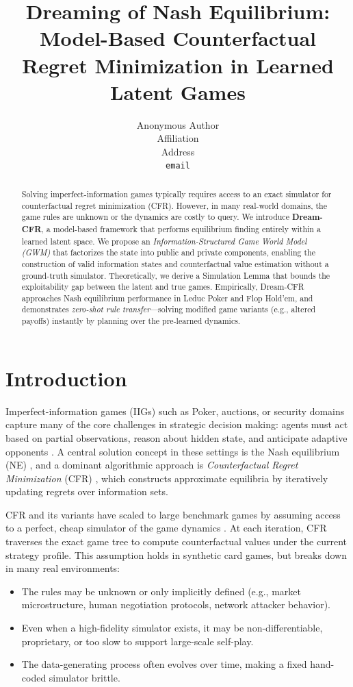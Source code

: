 \documentclass{article}
\title{Dreaming of Nash Equilibrium: Model-Based Counterfactual Regret Minimization in Learned Latent Games}
\author{%
  Anonymous Author \\
  Affiliation \\
  Address \\
  \texttt{email} \\
}
\date{}
\begin{document}
\maketitle

\begin{abstract}
Solving imperfect-information games typically requires access to an exact simulator for counterfactual regret minimization (CFR). However, in many real-world domains, the game rules are unknown or the dynamics are costly to query. We introduce \textbf{Dream-CFR}, a model-based framework that performs equilibrium finding entirely within a learned latent space. We propose an \emph{Information-Structured Game World Model (GWM)} that factorizes the state into public and private components, enabling the construction of valid information states and counterfactual value estimation without a ground-truth simulator. Theoretically, we derive a Simulation Lemma that bounds the exploitability gap between the latent and true games. Empirically, Dream-CFR approaches Nash equilibrium performance in Leduc Poker and Flop Hold'em, and demonstrates \emph{zero-shot rule transfer}---solving modified game variants (e.g., altered payoffs) instantly by planning over the pre-learned dynamics.
\end{abstract}

\section{Introduction}
\label{sec:intro}

Imperfect-information games (IIGs) such as Poker, auctions, or security domains capture many of the core challenges in strategic decision making: agents must act based on partial observations, reason about hidden state, and anticipate adaptive opponents \cite{bowling2015heads,brown2019superhuman}. A central solution concept in these settings is the Nash equilibrium (NE) \cite{nash1950equilibrium}, and a dominant algorithmic approach is \emph{Counterfactual Regret Minimization} (CFR) \cite{zinkevich2008regret}, which constructs approximate equilibria by iteratively updating regrets over information sets.

CFR and its variants have scaled to large benchmark games by assuming access to a perfect, cheap simulator of the game dynamics \cite{lanctot2017openspiel}. At each iteration, CFR traverses the exact game tree to compute counterfactual values under the current strategy profile. This assumption holds in synthetic card games, but breaks down in many real environments:
\begin{itemize}
    \item The rules may be unknown or only implicitly defined (e.g., market microstructure, human negotiation protocols, network attacker behavior).
    \item Even when a high-fidelity simulator exists, it may be non-differentiable, proprietary, or too slow to support large-scale self-play.
    \item The data-generating process often evolves over time, making a fixed hand-coded simulator brittle.
\end{itemize}
\end{document}
